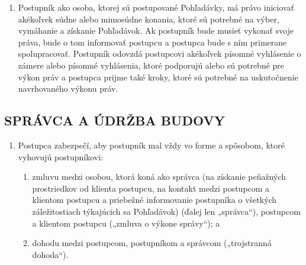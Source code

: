 \documentclass[a4paper]{article}
\begin{document}
\begin{multicols}{2}
\begin{enumerate}
    \item{Postupník ako osoba, ktorej sú postupované Pohľadávky, má právo iniciovať akékoľvek súdne alebo mimosúdne konania, ktoré sú potrebné na výber, vymáhanie a získanie Pohľadávok. Ak postupník bude musieť vykonať svoje práva, bude o tom informovať postupcu a postupca bude s ním primerane spolupracovať. Postupník odovzdá postupcovi akékoľvek písomné vyhlásenie o zámere alebo písomné vyhlásenia, ktoré podporujú alebo sú potrebné pre výkon práv a postupca prijme také kroky, ktoré sú potrebné na uskutočnenie navrhovaného výkonu práv.}
\end{enumerate}

\subsection{SPRÁVCA A ÚDRŽBA BUDOVY}
\begin{enumerate}
    \item{Postupca zabezpečí, aby postupník mal vždy vo forme a spôsobom, ktoré vyhovujú postupníkovi:}
    \begin{enumerate}
        \item{zmluvu medzi osobou, ktorá koná ako správca (na získanie peňažných prostriedkov od klienta postupcu, na kontakt medzi postupcom a klientom postupcu a priebežné informovanie postupníka o všetkých záležitostiach týkajúcich sa Pohľadávok) (ďalej len „správca“), postupcom a klientom postupcu („zmluva o výkone správy“); a}
        \item{dohodu medzi postupcom, postupníkom a správcom („trojstranná dohoda“).}
    \end{enumerate}
\end{enumerate}


\end{multicols}
\end{document}
